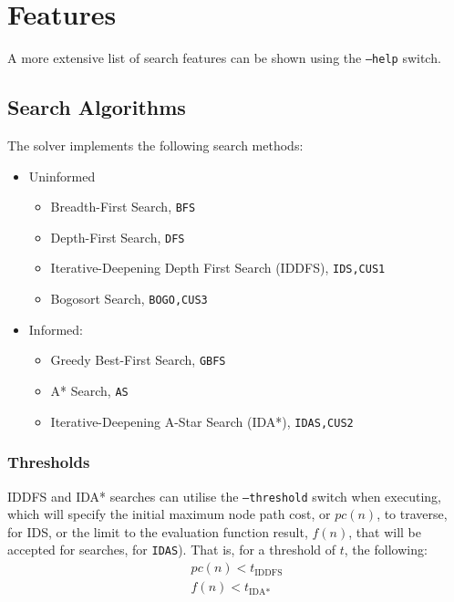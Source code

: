 \section{Features}

A more extensive list of search features can be shown using the \texttt{--help}
switch.

\subsection{Search Algorithms}
\label{sub:Search Algorithms}

The solver implements the following search methods:

\begin{itemize}
  \item Uninformed
  \begin{itemize}
    \item Breadth-First Search, \texttt{BFS}
    \item Depth-First Search, \texttt{DFS}
    \item Iterative-Deepening Depth First Search (IDDFS), \texttt{IDS,CUS1}
    \item Bogosort Search, \texttt{BOGO,CUS3}
  \end{itemize}
  \item Informed:
  \begin{itemize}
    \item Greedy Best-First Search, \texttt{GBFS}
    \item A* Search, \texttt{AS}
    \item Iterative-Deepening A-Star Search (IDA*), \texttt{IDAS,CUS2}
  \end{itemize}
\end{itemize}

\subsubsection{Thresholds}
\label{subs:Thresholds}

IDDFS and IDA* searches can utilise the \texttt{--threshold}
switch when executing, which will specify the initial maximum node path cost, or
$pc(n)$, to traverse, for IDS, or the limit to the evaluation function
result, $f(n)$, that will be accepted for searches, for \texttt{IDAS}).
That is, for a threshold of $t$, the following:
\begin{align}\label{eq:thresholds}
  pc(n) < t_{\text{IDDFS}}\\
  f(n) < t_{\text{IDA*}}
\end{align}

